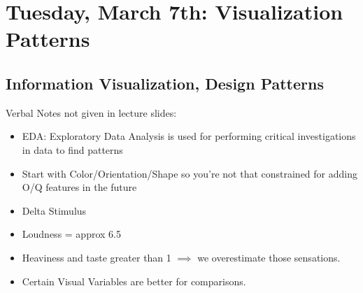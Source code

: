 \section{Tuesday, March 7th: Visualization Patterns}
\subsection{Information Visualization, Design Patterns}
Verbal Notes not given in lecture slides:
\begin{itemize}
    \item EDA: Exploratory Data Analysis is used for performing critical investigations in data to find patterns
    \item Start with Color/Orientation/Shape so you're not that constrained for adding O/Q features in the future
    \item Delta Stimulus
    \item Loudness = approx 6.5
    \item Heaviness and taste greater than 1 $\implies$ we overestimate those sensations.
    \item Certain Visual Variables are better for comparisons.
\end{itemize}
